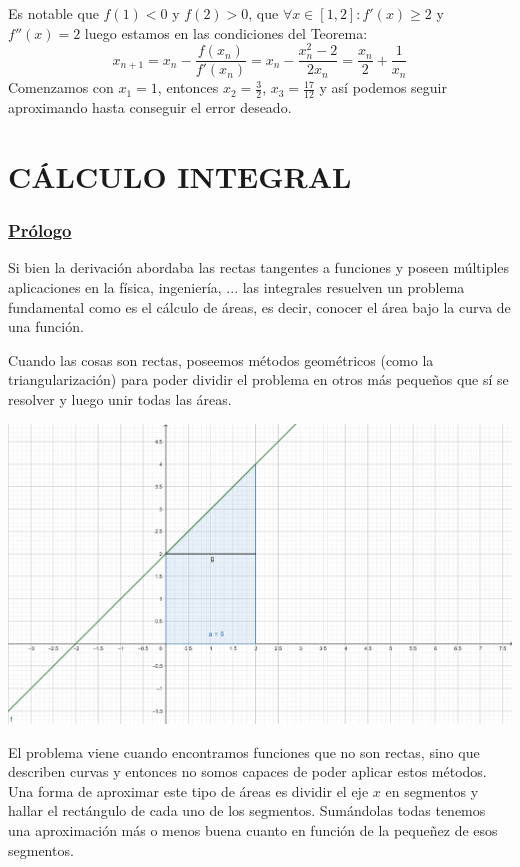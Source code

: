 \documentclass[10pt,a4paper,openright]{book}
\begin{document}
Es notable que $f(1)<0$ y $f(2)>0$, que $\forall x\in [1,2]: f'(x)\geq 2$ y $f''(x)=2$ luego estamos en las condiciones del Teorema:
$$x_{n+1}=x_n-\frac{f(x_n)}{f'(x_n)}=x_n-\frac{x_n^2-2}{2x_n}=\frac{x_n}{2}+\frac{1}{x_n}$$
Comenzamos con $x_1=1$, entonces $x_2=\frac{3}{2}$, $x_3=\frac{17}{12}$ y así podemos seguir aproximando hasta conseguir el error deseado.

\chapter*{CÁLCULO INTEGRAL}
\subsection*{\underline{Prólogo}}
Si bien la derivación abordaba las rectas tangentes a funciones y poseen múltiples aplicaciones en la física, ingeniería, ... las integrales resuelven un problema fundamental como es el cálculo de áreas, es decir, conocer el área bajo la curva de una función.

Cuando las cosas son rectas, poseemos métodos geométricos (como la triangularización) para poder dividir el problema en otros más pequeños que sí se resolver y luego unir todas las áreas.

\begin{center}
\includegraphics[scale=0.8]{area facil}
\end{center}

El problema viene cuando encontramos funciones que no son rectas, sino que describen curvas y entonces no somos capaces de poder aplicar estos métodos. Una forma de aproximar este tipo de áreas es dividir el eje $x$ en segmentos y hallar el rectángulo de cada uno de los segmentos. Sumándolas todas tenemos una aproximación más o menos buena cuanto en función de la pequeñez de esos segmentos.
\end{document}
